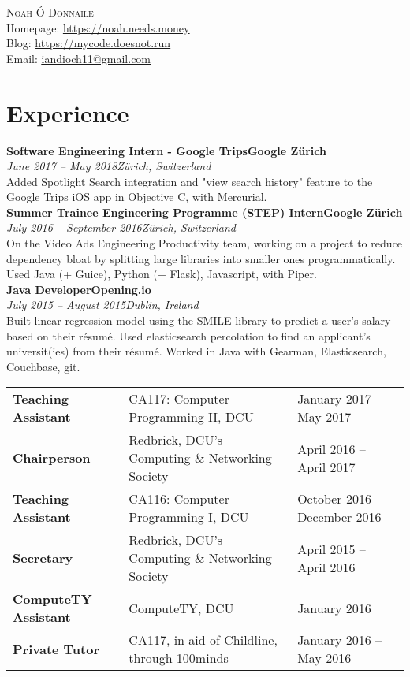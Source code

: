 \documentclass[a4paper, oneside, final]{scrartcl}
\newcommand{\nasc}[2]{\href{#1}{\color{blue}\setulcolor{blue}\ul{#2}}}
\newcommand{\rawnasc}[1]{\nasc{#1}{#1}}
\newcommand{\bearna}[0]{\vspace{3mm}\\}
\newcommand{\fmtdate}[1]{\textit{#1}}
\newcommand{\fmtaddress}[1]{\textit{#1}}
\newcommand{\fmtjobtitle}[1]{\textbf{#1}}
\begin{document}
 
\begin{center}
\textsc{\Huge{Noah Ó Donnaile}}
\bearna
Homepage: \rawnasc{https://noah.needs.money}\\Blog: \rawnasc{https://mycode.doesnot.run}\\
Email: \nasc{mailto:iandioch11+cv@gmail.com}{iandioch11@gmail.com}\\
\end{center}

\section{Experience}
\fmtjobtitle{Software Engineering Intern - Google Trips\hfill Google Zürich}\\
\fmtdate{June 2017 -- May 2018}\hfill\fmtaddress{Zürich, Switzerland}\\
Added Spotlight Search integration and "view search history" feature to the Google Trips iOS app in Objective C, with Mercurial.
\bearna
\fmtjobtitle{Summer Trainee Engineering Programme (STEP) Intern\hfill Google Zürich}\\
\fmtdate{July 2016 -- September 2016}\hfill\fmtaddress{Zürich, Switzerland}\\
On the Video Ads Engineering Productivity team, working on a project to reduce dependency bloat by splitting large libraries into smaller ones programmatically. Used Java (+ Guice), Python (+ Flask), Javascript, with Piper.
\bearna
\fmtjobtitle{Java Developer\hfill Opening.io}\\
\fmtdate{July 2015 -- August 2015}\hfill\fmtaddress{Dublin, Ireland}\\
Built linear regression model using the SMILE library to predict a user’s salary based on their résumé. Used elasticsearch percolation to find an applicant's universit(ies) from their résumé. Worked in Java with Gearman, Elasticsearch, Couchbase, git.
\bearna
{}
\begin{tabularx}{\columnwidth}{@{}p{.25\linewidth}XD@{}}
\fmtjobtitle{Teaching Assistant}&CA117: Computer Programming II, DCU&January 2017 -- May 2017\\
\fmtjobtitle{Chairperson}&Redbrick, DCU’s Computing \& Networking Society&April 2016 -- April 2017\\
\fmtjobtitle{Teaching Assistant}&CA116: Computer Programming I, DCU&October 2016 -- December 2016\\
\fmtjobtitle{Secretary}&Redbrick, DCU’s Computing \& Networking Society&April 2015 -- April 2016\\
\fmtjobtitle{ComputeTY Assistant}&ComputeTY, DCU&January 2016\\
\fmtjobtitle{Private Tutor}&CA117, in aid of Childline, through 100minds&January 2016 -- May 2016
\end{tabularx}
\end{document}
